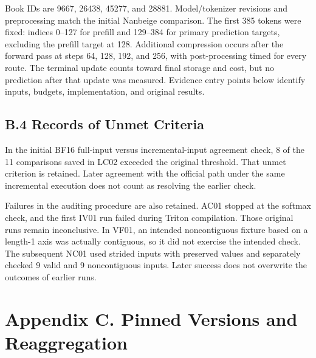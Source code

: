 \documentclass[10pt,a4paper]{article}
\begin{document}
Book IDs are 9667, 26438, 45277, and 28881. Model/tokenizer revisions and preprocessing match the initial Nanbeige comparison. The first 385 tokens were fixed: indices 0--127 for prefill and 129--384 for primary prediction targets, excluding the prefill target at 128. Additional compression occurs after the forward pass at steps 64, 128, 192, and 256, with post-processing timed for every route. The terminal update counts toward final storage and cost, but no prediction after that update was measured. Evidence entry points below identify inputs, budgets, implementation, and original results.

\subsection{B.4 Records of Unmet Criteria}\label{b.4-records-of-unmet-criteria}

In the initial BF16 full-input versus incremental-input agreement check, 8 of the 11 comparisons saved in LC02 exceeded the original threshold. That unmet criterion is retained. Later agreement with the official path under the same incremental execution does not count as resolving the earlier check.

Failures in the auditing procedure are also retained. AC01 stopped at the softmax check, and the first IV01 run failed during Triton compilation. Those original runs remain inconclusive. In VF01, an intended noncontiguous fixture based on a length-1 axis was actually contiguous, so it did not exercise the intended check. The subsequent NC01 used strided inputs with preserved values and separately checked 9 valid and 9 noncontiguous inputs. Later success does not overwrite the outcomes of earlier runs.

\section{Appendix C. Pinned Versions and Reaggregation}\label{appendix-c.-pinned-versions-and-reaggregation}
\end{document}
